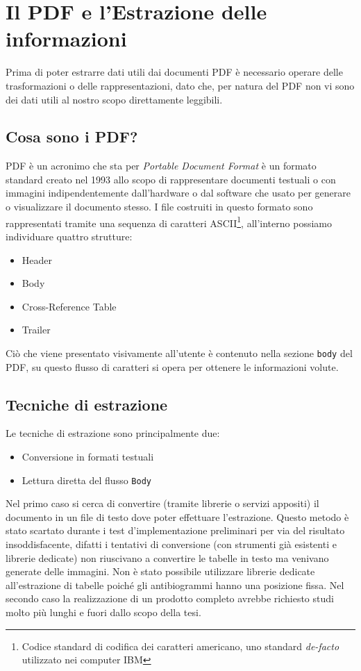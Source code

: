 \chapter{Il PDF e l'Estrazione delle informazioni}
Prima di poter estrarre dati utili dai documenti PDF è necessario operare delle trasformazioni o delle rappresentazioni, dato che, per natura del PDF non vi sono dei dati utili al nostro scopo direttamente leggibili.

\section{Cosa sono i PDF?}
PDF è un acronimo che sta per \textit{Portable Document Format} è un formato standard creato nel 1993 allo scopo di rappresentare documenti testuali o con immagini indipendentemente dall'hardware o dal software che usato per generare o visualizzare il documento stesso. I file costruiti in questo formato sono rappresentati tramite una sequenza di caratteri ASCII\footnote{Codice standard di codifica dei caratteri americano, uno standard \textit{de-facto} utilizzato nei computer IBM}, all'interno possiamo individuare quattro strutture:

\begin{itemize}
	\item Header
	\item Body
	\item Cross-Reference Table
	\item Trailer
\end{itemize}
Ciò che viene presentato visivamente all'utente è contenuto nella sezione \texttt{body} del PDF, su questo flusso di caratteri si opera per ottenere le informazioni volute.
\newpage
\section{Tecniche di estrazione}
Le tecniche di estrazione sono principalmente due:
\begin{itemize}
	\item Conversione in formati testuali
	\item Lettura diretta del flusso \texttt{Body}
\end{itemize}

Nel primo caso si cerca di convertire (tramite librerie o servizi appositi) il documento in un file di testo dove poter effettuare l'estrazione. Questo metodo è stato scartato durante i test d'implementazione preliminari per via del risultato insoddisfacente, difatti i tentativi di conversione (con strumenti già esistenti e librerie dedicate) non riuscivano a convertire le tabelle in testo ma venivano generate delle immagini. 
Non è stato possibile utilizzare librerie dedicate all'estrazione di tabelle poiché gli antibiogrammi hanno una posizione fissa.
Nel secondo caso la realizzazione di un prodotto completo avrebbe richiesto studi molto più lunghi e fuori dallo scopo della tesi.
